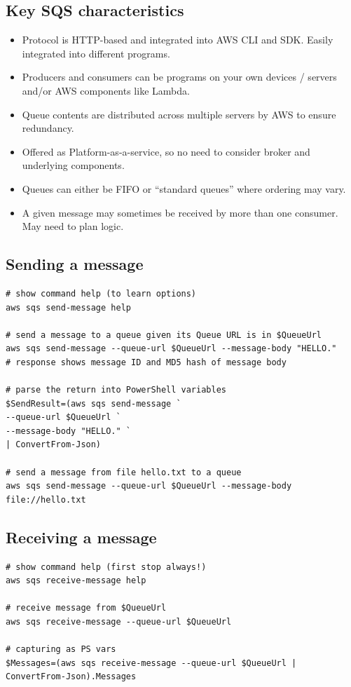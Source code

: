 \subsection{Key SQS characteristics}\label{key-sqs-characteristics}

\begin{itemize}
\item
  Protocol is HTTP-based and integrated into AWS CLI and SDK. Easily
  integrated into different programs.
\item
  Producers and consumers can be programs on your own devices / servers
  and/or AWS components like Lambda.
\item
  Queue contents are distributed across multiple servers by AWS to
  ensure redundancy.
\item
  Offered as Platform-as-a-service, so no need to consider broker and
  underlying components.
\item
  Queues can either be FIFO or ``standard queues'' where ordering may
  vary.
\item
  A given message may sometimes be received by more than one consumer.
  May need to plan logic.
\end{itemize}

\subsection{Sending a message}\label{sending-a-message}

\begin{verbatim}
# show command help (to learn options)
aws sqs send-message help

# send a message to a queue given its Queue URL is in $QueueUrl
aws sqs send-message --queue-url $QueueUrl --message-body "HELLO."
# response shows message ID and MD5 hash of message body

# parse the return into PowerShell variables
$SendResult=(aws sqs send-message `
--queue-url $QueueUrl `
--message-body "HELLO." `
| ConvertFrom-Json)

# send a message from file hello.txt to a queue
aws sqs send-message --queue-url $QueueUrl --message-body file://hello.txt
\end{verbatim}

\subsection{Receiving a message}\label{receiving-a-message}

\begin{verbatim}
# show command help (first stop always!)
aws sqs receive-message help

# receive message from $QueueUrl
aws sqs receive-message --queue-url $QueueUrl 

# capturing as PS vars
$Messages=(aws sqs receive-message --queue-url $QueueUrl | ConvertFrom-Json).Messages
\end{verbatim}

